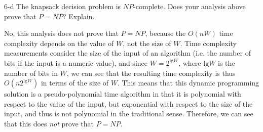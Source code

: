 \documentclass[11pt]{article}
\newcommand{\tlg}{\text{lg}}
\begin{document}
\begin{prob}{6-d}
The knapsack decision problem is $NP$-complete. Does your analysis above prove that $P = NP$? Explain.
\end{prob}
\begin{sol}
No, this analysis does not prove that $P = NP$, because the $O(nW)$ time complexity depends on the value of $W$, not the size of $W$. Time complexity measurements consider the size of the input of an algorithm (i.e. the number of bits if the input is a numeric value), and since $W = 2^{\tlg W}$, where $\tlg W$ is the number of bits in $W$, we can see that the resulting time complexity is thus $O(n2^{\tlg W})$ in terms of the size of $W$. This means that this dynamic programming solution is a pseudo-polynomial time algorithm in that it is polynomial with respect to the value of the input, but exponential with respect to the size of the input, and thus is not polynomial in the traditional sense. Therefore, we can see that this does \emph{not} prove that $P = NP$.

\end{sol}
\end{document}
